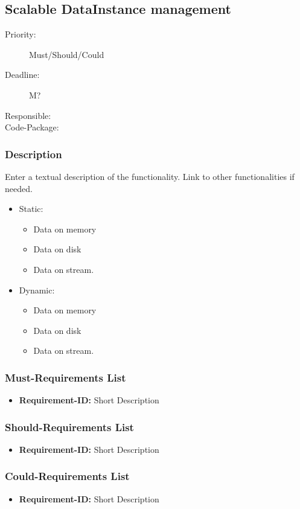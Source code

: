 \subsection{Scalable DataInstance management}
\label{Functionality:ID}

\begin{description}
\item[Priority:] Must/Should/Could
\item[Deadline:] M?
\item[Responsible:]
\item[Code-Package:]
\end{description}

\subsubsection*{Description}

Enter a textual description of the functionality. Link to other functionalities if needed. 
\begin{itemize}
\item Static:

\begin{itemize}
\item Data on memory
\item Data on disk
\item Data on stream.
\end{itemize}
\item Dynamic:
\begin{itemize}
\item Data on memory
\item Data on disk
\item Data on stream.
\end{itemize}
\end{itemize}

\subsubsection*{Must-Requirements List}

\begin{itemize}
\item \textbf{Requirement-ID:} Short Description
\end{itemize}

\subsubsection*{Should-Requirements List}

\begin{itemize}
\item \textbf{Requirement-ID:} Short Description
\end{itemize}

\subsubsection*{Could-Requirements List}

\begin{itemize}
\item \textbf{Requirement-ID:} Short Description
\end{itemize}

